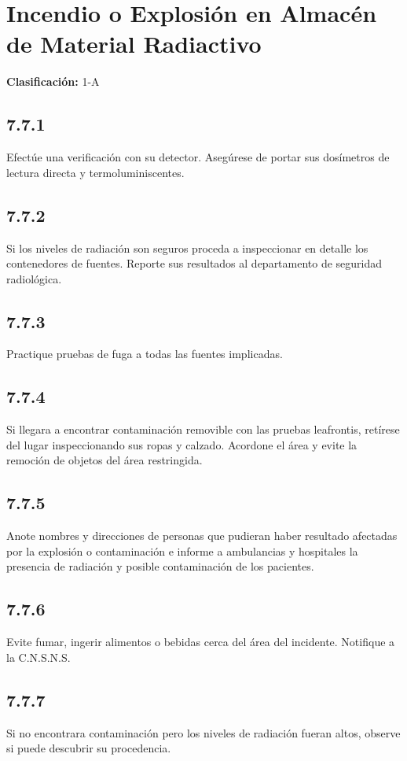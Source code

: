 \section{Incendio o Explosión en Almacén de Material Radiactivo}

\textbf{Clasificación:} 1-A

\subsection*{7.7.1}
Efectúe una verificación con su detector. Asegúrese de portar sus dosímetros de lectura directa y termoluminiscentes.

\subsection*{7.7.2}
Si los niveles de radiación son seguros proceda a inspeccionar en detalle los contenedores de fuentes. Reporte sus resultados al departamento de seguridad radiológica.

\subsection*{7.7.3}
Practique pruebas de fuga a todas las fuentes implicadas.

\subsection*{7.7.4}
Si llegara a encontrar contaminación removible con las pruebas leafrontis, retírese del lugar inspeccionando sus ropas y calzado. Acordone el área y evite la remoción de objetos del área restringida.

\subsection*{7.7.5}
Anote nombres y direcciones de personas que pudieran haber resultado afectadas por la explosión o contaminación e informe a ambulancias y hospitales la presencia de radiación y posible contaminación de los pacientes.

\subsection*{7.7.6}
Evite fumar, ingerir alimentos o bebidas cerca del área del incidente. Notifique a la C.N.S.N.S.

\subsection*{7.7.7}
Si no encontrara contaminación pero los niveles de radiación fueran altos, observe si puede descubrir su procedencia.